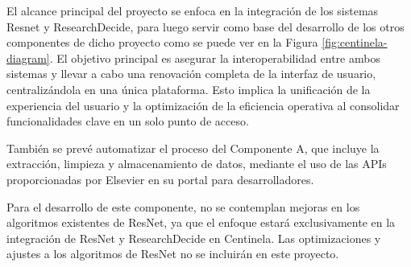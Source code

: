 El alcance principal del proyecto se enfoca en la integración de los sistemas Resnet y ResearchDecide, para luego servir como base del desarrollo de los otros componentes de dicho proyecto como se puede ver en la Figura \ref{fig:centinela-diagram}. 
El objetivo principal es asegurar la interoperabilidad entre ambos sistemas y llevar a cabo una renovación completa de la interfaz de usuario, centralizándola en una única plataforma. Esto implica la unificación de la experiencia del usuario y la optimización de la eficiencia operativa al consolidar funcionalidades clave en un solo punto de acceso. 

También se prevé automatizar el proceso del Componente A, que incluye la extracción, limpieza y almacenamiento de datos, mediante el uso de las APIs proporcionadas por Elsevier \cite{ELSEVIER} en su portal para desarrolladores.

Para el desarrollo de este componente, no se contemplan mejoras en los algoritmos existentes de ResNet, ya que el enfoque estará exclusivamente en la integración de ResNet y ResearchDecide en Centinela. Las optimizaciones y ajustes a los algoritmos de ResNet no se incluirán en este proyecto.
